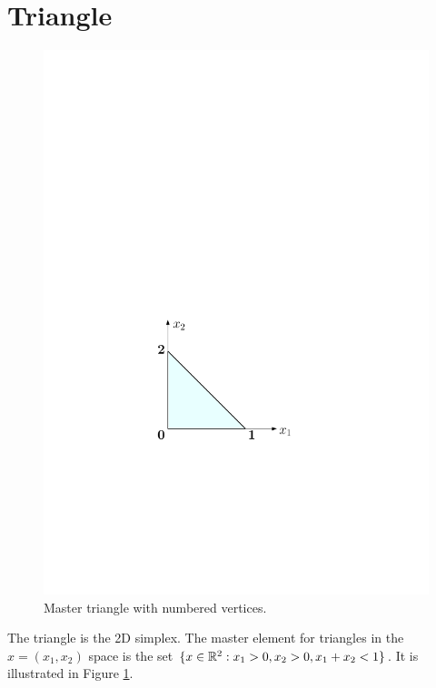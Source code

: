 \section{Triangle}
\label{sec:Tri}

\begin{figure}[!ht]
\begin{center}
\includegraphics[scale=0.5]{./figures/MasterTri.pdf}
\caption{Master triangle with numbered vertices.}
\label{fig:MasterTriangle}
\end{center}
\end{figure}

The triangle is the 2D simplex.
The master element for triangles in the $x=(x_1,x_2)$ space is the set $\{x\in\mathbb{R}^2:x_1>0,x_2>0,x_1+x_2<1\}$. 
It is illustrated in Figure \ref{fig:MasterTriangle}.

